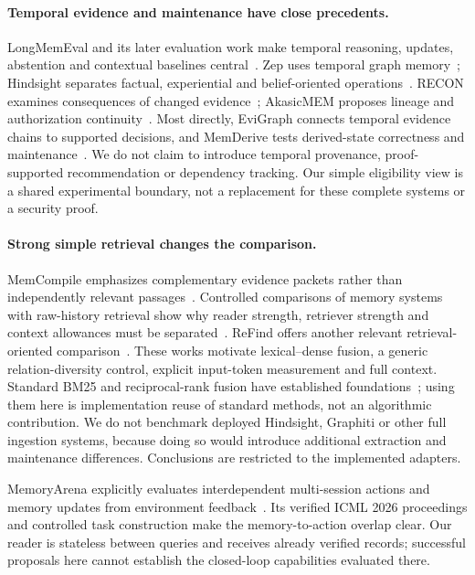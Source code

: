 \paragraph{Temporal evidence and maintenance have close precedents.}
LongMemEval and its later evaluation work make temporal reasoning, updates, abstention and contextual baselines central~\citep{p241010813,p260512493}. Zep uses temporal graph memory~\citep{p250113956}; Hindsight separates factual, experiential and belief-oriented operations~\citep{p251212818}. RECON examines consequences of changed evidence~\citep{p260716716}; AkasicMEM proposes lineage and authorization continuity~\citep{p260925563}. Most directly, EviGraph connects temporal evidence chains to supported decisions, and MemDerive tests derived-state correctness and maintenance~\citep{p261000212,p261025373}. We do not claim to introduce temporal provenance, proof-supported recommendation or dependency tracking. Our simple eligibility view is a shared experimental boundary, not a replacement for these complete systems or a security proof.

\paragraph{Strong simple retrieval changes the comparison.}
MemCompile emphasizes complementary evidence packets rather than independently relevant passages~\citep{p261023313}. Controlled comparisons of memory systems with raw-history retrieval show why reader strength, retriever strength and context allowances must be separated~\citep{p261024671}. ReFind offers another relevant retrieval-oriented comparison~\citep{p260812888}. These works motivate lexical--dense fusion, a generic relation-diversity control, explicit input-token measurement and full context. Standard BM25 and reciprocal-rank fusion have established foundations~\citep{robertson2009,cormack2009}; using them here is implementation reuse of standard methods, not an algorithmic contribution. We do not benchmark deployed Hindsight, Graphiti or other full ingestion systems, because doing so would introduce additional extraction and maintenance differences. Conclusions are restricted to the implemented adapters.

MemoryArena explicitly evaluates interdependent multi-session actions and memory updates from environment feedback~\citep{p260216313}. Its verified ICML 2026 proceedings and controlled task construction make the memory-to-action overlap clear. Our reader is stateless between queries and receives already verified records; successful proposals here cannot establish the closed-loop capabilities evaluated there.

